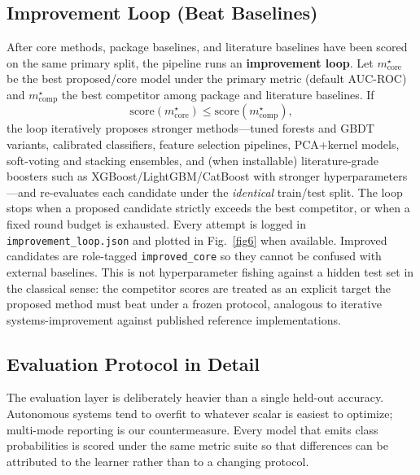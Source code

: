 \documentclass[10pt,journal]{IEEEtran}
\begin{document}
\subsection{Improvement Loop (Beat Baselines)}
After core methods, package baselines, and literature baselines have been scored on the same
primary split, the pipeline runs an \textbf{improvement loop}. Let $m^\star_{\mathrm{core}}$ be
the best proposed/core model under the primary metric (default AUC-ROC) and
$m^\star_{\mathrm{comp}}$ the best competitor among package and literature baselines. If
\begin{equation}
\mathrm{score}(m^\star_{\mathrm{core}}) \le \mathrm{score}(m^\star_{\mathrm{comp}}),
\end{equation}
the loop iteratively proposes stronger methods---tuned forests and GBDT variants, calibrated
classifiers, feature selection pipelines, PCA+kernel models, soft-voting and stacking
ensembles, and (when installable) literature-grade boosters such as XGBoost/LightGBM/CatBoost
with stronger hyperparameters---and re-evaluates each candidate under the \emph{identical}
train/test split. The loop stops when a proposed candidate strictly exceeds the best
competitor, or when a fixed round budget is exhausted. Every attempt is logged in
\texttt{improvement\_loop.json} and plotted in Fig.~\ref{fig6} when available. Improved
candidates are role-tagged \texttt{improved\_core} so they cannot be confused with external
baselines. This is not hyperparameter fishing against a hidden test set in the classical sense:
the competitor scores are treated as an explicit target the proposed method must beat under a
frozen protocol, analogous to iterative systems-improvement against published reference
implementations.

\subsection{Evaluation Protocol in Detail}
The evaluation layer is deliberately heavier than a single held-out accuracy. Autonomous
systems tend to overfit to whatever scalar is easiest to optimize; multi-mode reporting is
our countermeasure. Every model that emits class probabilities is scored under the same
metric suite so that differences can be attributed to the learner rather than to a changing
protocol.
\end{document}
